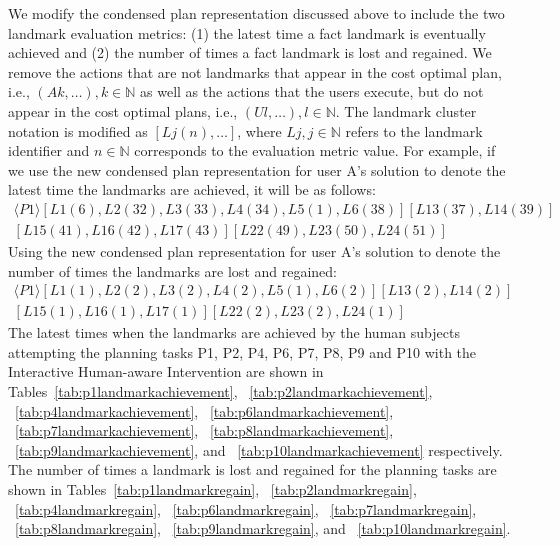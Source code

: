 We modify the condensed plan representation discussed above to include the two landmark evaluation metrics: (1) the latest time a fact landmark is eventually achieved and (2) the number of times a fact landmark is lost and regained.
We remove the actions that are not landmarks that appear in the cost optimal plan, i.e., $(Ak, \ldots), k\in\mathbb{N}$ as well as the actions that the users execute, but do not appear in the cost optimal plans, i.e., $(Ul, \ldots), l\in\mathbb{N}$.
The landmark cluster notation is modified as $[Lj(n), \ldots]$, where $Lj, j\in\mathbb{N}$ refers to the landmark identifier and $n\in\mathbb{N}$ corresponds to the evaluation metric value.
For example, if we use the new condensed plan representation for user A's solution to denote the latest time the landmarks are achieved, it will be as follows:
\begin{multline}
\langle P1\rangle [L1(6), L2(32), L3(33), L4(34), L5(1), L6(38)] [L13(37), L14(39)] \\ [L15(41), L16(42), L17(43)] [L22(49), L23(50), L24(51)]
\end{multline}
Using the new condensed plan representation for user A's solution to denote the number of times the landmarks are lost and regained:
\begin{multline}
\langle P1\rangle [L1(1), L2(2), L3(2), L4(2), L5(1), L6(2)] [L13(2), L14(2)] \\ [L15(1), L16(1), L17(1)] [L22(2), L23(2), L24(1)]
\end{multline}
The latest times when the landmarks are achieved by the human subjects attempting the planning tasks P1, P2, P4, P6, P7, P8, P9 and P10 with the Interactive Human-aware Intervention are shown in Tables~\ref{tab:p1landmarkachievement}, ~\ref{tab:p2landmarkachievement}, ~\ref{tab:p4landmarkachievement}, ~\ref{tab:p6landmarkachievement}, ~\ref{tab:p7landmarkachievement}, ~\ref{tab:p8landmarkachievement}, ~\ref{tab:p9landmarkachievement}, and ~\ref{tab:p10landmarkachievement} respectively.
The number of times a landmark is lost and regained for the planning tasks are shown in Tables~\ref{tab:p1landmarkregain}, ~\ref{tab:p2landmarkregain}, ~\ref{tab:p4landmarkregain}, ~\ref{tab:p6landmarkregain}, ~\ref{tab:p7landmarkregain}, ~\ref{tab:p8landmarkregain}, ~\ref{tab:p9landmarkregain}, and ~\ref{tab:p10landmarkregain}.

